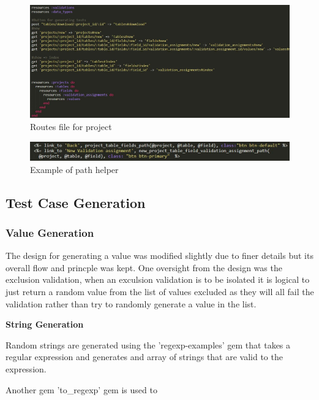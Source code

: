 \documentclass[a4paper,12pt]{article}
\begin{document}
\begin{figure}
\includegraphics[width=\linewidth]{screenshots/routes}
\caption{Routes file for project}
\label{fig:routes}
\end{figure}

\begin{figure}
\includegraphics[width=\linewidth]{screenshots/root}
\caption{Example of path helper}
\label{fig:pathhelp}
\end{figure}

\subsection{Test Case Generation}


\subsubsection{Value Generation}

\par The design for generating a value was modified slightly due to finer details but its overall flow and princple was kept. One oversight from the design was the exclusion validation, when an exculsion validation is to be isolated it is logical to just return a random value from the list of values excluded as they will all fail the validation rather than try to randomly generate a value in the list.

\par \textbf{String Generation}
\par Random strings are generated using the 'regexp-examples'\cite{regexprangem} gem that takes a regular expression and generates and array of strings that are valid to the expression. 
\par Another gem 'to\_regexp' gem\cite{regexpstrgem} is used to 
\end{document}
